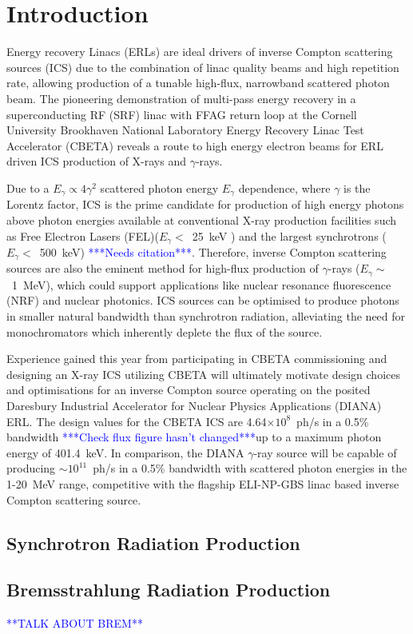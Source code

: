\documentclass[../main.tex]{subfiles}
\begin{document}
\chapter{Introduction}
\label{Introduction} %

Energy recovery Linacs (ERLs) are ideal drivers of inverse Compton scattering sources (ICS) due to the combination of linac quality beams and high repetition rate, allowing production of a tunable high-flux, narrowband scattered photon beam. The pioneering demonstration of multi-pass energy recovery in a superconducting RF (SRF) linac with FFAG return loop at the Cornell University Brookhaven National Laboratory Energy Recovery Linac Test Accelerator (CBETA) \cite{hoffstaetter2017cbeta} reveals a route to high energy electron beams for ERL driven ICS production of X-rays and $\gamma$-rays.

Due to a $E_{\gamma} \propto 4\gamma^{2}$ scattered photon energy $E_{\gamma}$ dependence, where $\gamma$ is the Lorentz factor, ICS is the prime candidate for production of high energy photons above photon energies available at conventional X-ray production facilities such as Free Electron Lasers (FEL)($E_{\gamma} <$~25~keV \cite{schneidmiller2011photon}) and the largest synchrotrons ($E_{\gamma} <$~500~keV) \textcolor{blue}{***Needs citation***}. Therefore, inverse Compton scattering sources are also the eminent method for high-flux production of $\gamma$-rays ($E_{\gamma} \sim$~1~MeV), which could support applications like nuclear resonance fluorescence (NRF) and nuclear photonics. ICS sources can be optimised to produce photons in smaller natural bandwidth than synchrotron radiation, alleviating the need for monochromators which inherently deplete the flux of the source. 

Experience gained this year from participating in CBETA commissioning and designing an X-ray ICS utilizing CBETA will ultimately motivate design choices and optimisations for an inverse Compton source operating on the posited Daresbury Industrial Accelerator for Nuclear Physics Applications (DIANA) ERL. The design values for the CBETA ICS are 4.64$\times 10^{8}$~ph/s in a 0.5\% bandwidth \textcolor{blue}{***Check flux figure hasn't changed***}up to a maximum photon energy of 401.4~keV. In comparison, the DIANA $\gamma$-ray source will be capable of producing $\sim 10^{11}$~ph/s in a 0.5\% bandwidth with scattered photon energies in the 1-20~MeV range, competitive with the flagship ELI-NP-GBS \cite{adriani2014technical} linac based inverse Compton scattering source. 

\section{Synchrotron Radiation Production}
\section{Bremsstrahlung Radiation Production}
\textcolor{blue}{**TALK ABOUT BREM**}
\label{sec:bremsstrahlung}
\end{document}

